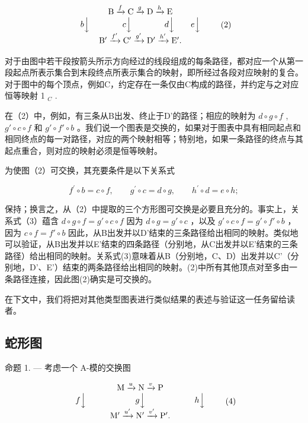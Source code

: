 \[
\begin{array}{c} \mathrm{B} \xrightarrow {f} \mathrm{C} \xrightarrow {g} \mathrm{D} \xrightarrow {h} \mathrm{E} \\ b \Big \downarrow \qquad \qquad c \Big \downarrow \qquad \qquad d \Big \downarrow \qquad e \Big \downarrow \\ \mathrm{B} ^ {\prime} \xrightarrow {f ^ {\prime}} \mathrm{C} ^ {\prime} \xrightarrow {g ^ {\prime}} \mathrm{D} ^ {\prime} \xrightarrow {h ^ {\prime}} \mathrm{E} ^ {\prime}. \end{array}\tag{2}
\]

对于由图中若干段按箭头所示方向经过的线段组成的每条路径，都对应一个从第一段起点所表示集合到末段终点所表示集合的映射，即所经过各段对应映射的复合。对于图中的每个顶点，例如C，约定存在一条仅由C构成的路径，并约定与之对应恒等映射 1 \(_{C}\) .

在（2）中，例如，有三条从B出发、终止于D'的路径；相应的映射为 \(d \circ g \circ f\) , \(g' \circ c \circ f\) 和 \(g' \circ f' \circ b\) 。我们说一个图表是交换的，如果对于图表中具有相同起点和相同终点的每一对路径，对应的两个映射相等；特别地，如果一条路径的终点与其起点重合，则对应的映射必须是恒等映射。

为使图（2）可交换，其充要条件是以下关系式

\[
f ^ {\prime} \circ b = c \circ f, \qquad g ^ {\prime} \circ c = d \circ g, \qquad h ^ {\prime} \circ d = e \circ h;\tag{3}
\]

保持；换言之，从（2）中提取的三个方形图可交换是必要且充分的。事实上，关系式（3）蕴含 \(d \circ g \circ f = g' \circ c \circ f\) 因为 \(d \circ g = g' \circ c\) ，以及 \(g' \circ c \circ f = g' \circ f' \circ b\) ，因为 \(c \circ f = f' \circ b\) 因此，从B出发并以D'结束的三条路径给出相同的映射。类似地可以验证，从B出发并以E'结束的四条路径（分别地，从C出发并以E'结束的三条路径）给出相同的映射。关系式(3)意味着从B（分别地，C、D）出发并以C'（分别地，D'、E'）结束的两条路径给出相同的映射。(2)中所有其他顶点对至多由一条路径连接，因此图(2)确实是可交换的。

在下文中，我们将把对其他类型图表进行类似结果的表述与验证这一任务留给读者。

\subsection{蛇形图}

命题 1. --- 考虑一个 A-模的交换图

\[
\begin{array}{c} \mathrm{M} \xrightarrow {u} \mathrm{N} \xrightarrow {v} \mathrm{P} \\ f \Big \downarrow \qquad \qquad \qquad g \Big \downarrow \qquad \qquad \qquad h \Big \downarrow \\ \mathrm{M} ^ {\prime} \xrightarrow {u ^ {\prime}} \mathrm{N} ^ {\prime} \xrightarrow {v ^ {\prime}} \mathrm{P} ^ {\prime}. \end{array}\tag{4}
\]

